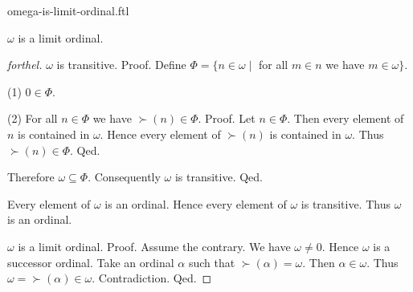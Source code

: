 \documentclass{naproche-library}
\begin{document}
\begin{smodule}[title=$\omega$ is a Limit Ordinal]{omega-is-limit-ordinal.ftl}

\begin{proposition}[forthel,id=SET_THEORY_03_764451995254784]
  $\omega$ is a limit ordinal.
\end{proposition}
\begin{proof}[forthel]
  $\omega$ is transitive. \newline
  Proof.
    Define $\Phi = \{ n \in \omega \mid$ for all $m \in n$ we have $m \in \omega \}$.

    (1) $0 \in \Phi$.

    (2) For all $n \in \Phi$ we have $\succ(n) \in \Phi$. \newline
    Proof.
      Let $n \in \Phi$.
      Then every element of $n$ is contained in $\omega$.
      Hence every element of $\succ(n)$ is contained in $\omega$.
      Thus $\succ(n) \in \Phi$.
    Qed.

    Therefore $\omega \subseteq \Phi$.
    Consequently $\omega$ is transitive.
  Qed.

  Every element of $\omega$ is an ordinal.
  Hence every element of $\omega$ is transitive.
  Thus $\omega$ is an ordinal.

  $\omega$ is a limit ordinal. \newline
  Proof.
    Assume the contrary.
    We have $\omega \neq 0$.
    Hence $\omega$ is a successor ordinal.
    Take an ordinal $\alpha$ such that $\succ(\alpha) = \omega$.
    Then $\alpha \in \omega$.
    Thus $\omega = \succ(\alpha) \in \omega$.
    Contradiction.
  Qed.
\end{proof}
\end{smodule}
\end{document}
